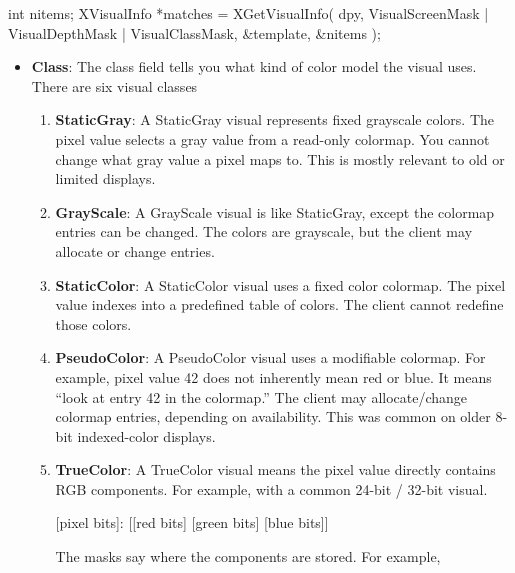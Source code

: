 \documentclass{report}
\begin{document}
\begin{itemize}
\begin{cppcode}
                int nitems;
                XVisualInfo *matches = XGetVisualInfo(
                    dpy,
                    VisualScreenMask | VisualDepthMask | VisualClassMask,
                    &template,
                    &nitems
                );
            \end{cppcode}
            \bigbreak \noindent
            \begin{itemize}
                \item \textbf{Class}: The class field tells you what kind of color model the visual uses. There are six visual classes
                    \begin{enumerate}
                        \item \textbf{StaticGray}: A StaticGray visual represents fixed grayscale colors. The pixel value selects a gray value from a read-only colormap.
                            \bigbreak \noindent 
                            You cannot change what gray value a pixel maps to. This is mostly relevant to old or limited displays.
                        \item \textbf{GrayScale}: A GrayScale visual is like StaticGray, except the colormap entries can be changed. The colors are grayscale, but the client may allocate or change entries.
                        \item \textbf{StaticColor}: A StaticColor visual uses a fixed color colormap. The pixel value indexes into a predefined table of colors. The client cannot redefine those colors.
                        \item \textbf{PseudoColor}: A PseudoColor visual uses a modifiable colormap. For example, pixel value 42 does not inherently mean red or blue. It means “look at entry 42 in the colormap.”
                            \bigbreak \noindent 
                            The client may allocate/change colormap entries, depending on availability. This was common on older 8-bit indexed-color displays.
                        \item \textbf{TrueColor}: A TrueColor visual means the pixel value directly contains RGB components. For example, with a common 24-bit / 32-bit visual.
                            \begin{center}
                                [pixel bits]: [[red bits] [green bits] [blue bits]]
                            \end{center}
                            The masks say where the components are stored. For example,
                            \bigbreak \noindent 

\end{enumerate}
\end{itemize}
\end{itemize}
\end{document}
